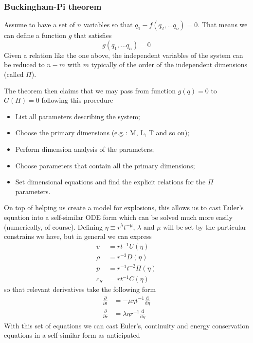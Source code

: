 \subsubsection*{Buckingham-Pi theorem}
Assume to have a set of $n$ variables so that $q_{1}-f(q_{2},...q_{n})=0$. That means we can define a function $g$ that satisfies
\begin{equation*}
    g(q_{1},...q_{n}) = 0
\end{equation*}
Given a relation like the one above, the independent variables of the system can be reduced to $n-m$ with $m$ typically of the order of the independent dimensions (called $\Pi$).
\par The theorem then claims that we may pass from function $g(q)=0$ to $G(\Pi)=0$ following this procedure
\begin{itemize}
    \item List all parameters describing the system;
    \item Choose the primary dimensions (e.g.\,: M, L, T and so on);
    \item Perform dimension analysis of the parameters;
    \item Choose parameters that contain all the primary dimensions;
    \item Set dimensional equations and find the explicit relations for the $\Pi$ parameters.
\end{itemize}
On top of helping us create a model for explosions, this allows us to cast Euler's equation into a self-similar ODE form which can be solved much more easily (numerically, of course). Defining $\eta \equiv r^{\lambda} t^{-\mu}$, $\lambda$ and $\mu$ will be set by the particular constrains we have, but in general we can express 
\begin{align*}
v &= r t^{-1} U(\eta) \\
\rho &= r^{-3} D(\eta) \\
p &= r^{-1}t^{-2} \Pi (\eta) \\
c_S &= r t^{-1} C(\eta)
\end{align*}
so that relevant derivatives take the following form 
\begin{align*}
    \frac{\partial}{\partial t} &= -\mu \eta t^{-1} \frac{\text{d}}{\text{d}\eta} \\
\frac{\partial}{\partial r} &= \lambda \eta r^{-1} \frac{\text{d}}{\text{d}\eta}
\end{align*}
With this set of equations we can cast Euler's, continuity and energy conservation equations in a self-similar form as anticipated
